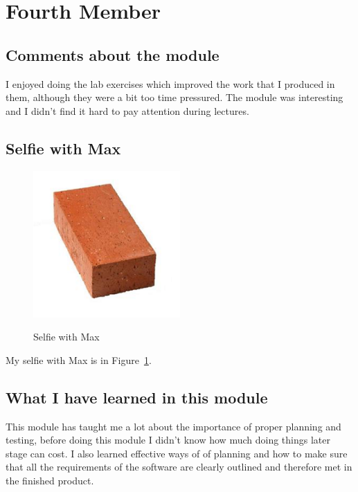 \section{Fourth Member}
\subsection{Comments about the module}
I enjoyed doing the lab exercises which improved the work that I produced in them, although they were a bit too time pressured. The module was interesting and I didn't find it hard to pay attention during lectures.

\subsection{Selfie with Max}
\begin{figure}[h]
\caption{Selfie with Max}
\centering
\includegraphics[width=0.5\textwidth]{brick.png}
\label{fig:selfie}
\end{figure}

My selfie with Max is in  Figure~\ref{fig:selfie}.

\subsection{What I have learned in this module}
This module has taught me a lot about the importance of proper planning and testing, before doing this module I didn't know how much doing things later stage can cost. I also learned effective ways of of planning and how to make sure that all the requirements of the software are clearly outlined and therefore met in the finished product.

